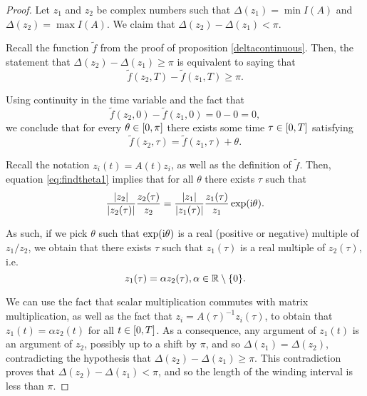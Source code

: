 \begin{proof}
Let $z_1$ and $z_2$ be complex numbers such that $\Delta(z_1) = \min I(A)$ and $\Delta(z_2) = \max I(A)$. We claim that $\Delta(z_2) - \Delta(z_1) < \pi$.

Recall the function $\tilde f$ from the proof of proposition \ref{deltacontinuous}. Then, the statement that $\Delta(z_2) - \Delta(z_1) \geq \pi$ is equivalent to saying that
\begin{equation}
\tilde f(z_2, T) - \tilde f(z_1, T) \geq \pi.
\end{equation}

Using continuity in the time variable and the fact that
\begin{equation}
\tilde f(z_2, 0) - \tilde f(z_1, 0) = 0 - 0 = 0,
\end{equation}
we conclude that for every $\theta \in \interval 0 \pi$ there exists some time $\tau \in \interval 0 T$ satisfying
\begin{equation}\label{eq:findtheta1}
\tilde f(z_2, \tau) = \tilde f(z_1, \tau) + \theta.
\end{equation}

Recall the notation $z_i(t) = A(t) z_i$, as well as the definition of $\tilde f$. Then, equation \eqref{eq:findtheta1} implies that for all $\theta$ there exists $\tau$ such that
\begin{equation}\label{eq:findtheta2}
\frac{\lvert z_2\rvert}{\lvert z_2(\tau)\rvert} \frac{z_2(\tau)}{z_2} = \frac{\lvert z_1\rvert}{\lvert z_1(\tau)\rvert} \frac{z_1(\tau)}{z_1} \exp(\mathrm{i} \theta).	
\end{equation}

As such, if we pick $\theta$ such that $\exp(\mathrm{i} \theta)$ is a real (positive or negative) multiple of $z_1 / z_2$, we obtain that there exists $\tau$ such that $z_1(\tau)$ is a real multiple of $z_2(\tau)$, i.e.
\begin{equation}
z_1(\tau) = \alpha z_2(\tau), \alpha \in \mathbb{R} \setminus \{0\}.
\end{equation}

We can use the fact that scalar multiplication commutes with matrix multiplication, as well as the fact that $z_i = A(\tau)^{-1} z_i(\tau)$, to obtain that $z_1(t) = \alpha z_2(t)$ for all $t \in \interval 0 T$. As a consequence, any argument of $z_1(t)$ is an argument of $z_2$, possibly up to a shift by $\pi$, and so $\Delta(z_1) = \Delta(z_2)$, contradicting the hypothesis that $\Delta(z_2) - \Delta(z_1) \geq \pi$. This contradiction proves that $\Delta(z_2) - \Delta(z_1) < \pi$, and so the length of the winding interval is less than $\pi$.
\end{proof}

